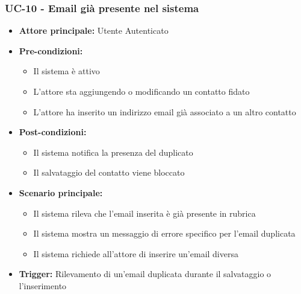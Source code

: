 \documentclass[a4paper,12pt]{article}
\begin{document}
\subsubsection{UC-10 - Email già presente nel sistema} \label{subsec:UC-10}
\begin{itemize}
    \item \textbf{Attore principale:} Utente Autenticato
    \item \textbf{Pre-condizioni:}
    \begin{itemize}
        \item Il sistema è attivo
        \item L'attore sta aggiungendo o modificando un contatto fidato
        \item L'attore ha inserito un indirizzo email già associato a un altro contatto
    \end{itemize}
    \item \textbf{Post-condizioni:}
    \begin{itemize}
        \item Il sistema notifica la presenza del duplicato
        \item Il salvataggio del contatto viene bloccato
    \end{itemize}
    \item \textbf{Scenario principale:}
    \begin{itemize}
        \item Il sistema rileva che l'email inserita è già presente in rubrica
        \item Il sistema mostra un messaggio di errore specifico per l'email duplicata
        \item Il sistema richiede all'attore di inserire un'email diversa
    \end{itemize}
    \item \textbf{Trigger:} Rilevamento di un'email duplicata durante il salvataggio o l'inserimento
\end{itemize}
\end{document}
